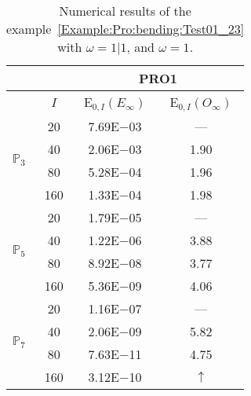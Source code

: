 \begin{table}[H]
\caption{Numerical results of the example~\ref{Example:Pro:bending:Test01_23} with $\omega=1|1$, and $\omega=1$.}
\setlength{\tabcolsep}{5pt}
\centering
\begin{tabular}{@{}l c c c@{}}
\toprule
 &  & \multicolumn{2}{c}{PRO1}\\
\midrule
 & $I$ & E$_{0,I}(E_{\infty})$ & E$_{0,I}(O_{\infty})$\\
\midrule
\multirow{4}{*}{$\mathbb{P}_{3}$} & 20 & 7.69E$-$03 & ---\\
 & 40 & 2.06E$-$03 & 1.90\\
 & 80 & 5.28E$-$04 & 1.96\\
 & 160 & 1.33E$-$04 & 1.98\\
\midrule
\multirow{4}{*}{$\mathbb{P}_{5}$} & 20 & 1.79E$-$05 & ---\\
 & 40 & 1.22E$-$06 & 3.88\\
 & 80 & 8.92E$-$08 & 3.77\\
 & 160 & 5.36E$-$09 & 4.06\\
\midrule
\multirow{4}{*}{$\mathbb{P}_{7}$} & 20 & 1.16E$-$07 & ---\\
 & 40 & 2.06E$-$09 & 5.82\\
 & 80 & 7.63E$-$11 & 4.75\\
 & 160 & 3.12E$-$10 & $\uparrow$\\
\bottomrule
\end{tabular}
\label{Table:PRO:test_01_23_test5}
\end{table}
